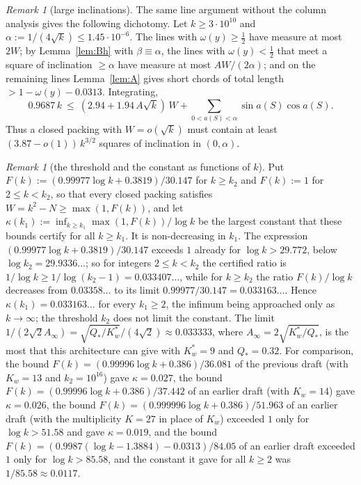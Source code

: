 \documentclass[11pt]{amsart}
\theoremstyle{definition}
\theoremstyle{remark}
\newtheorem{remark}[theorem]{Remark}
\begin{document}
\begin{remark}[large inclinations]
The same line argument without the column analysis gives the following dichotomy. Let $k\ge3\cdot10^{10}$ and
$\alpha:=1/(4\sqrt k)\le1.45\cdot10^{-6}$. The lines with $\omega(y)\ge\frac12$ have measure at most $2W$; by Lemma~\ref{lem:Bh} with $\beta\equiv\alpha$, the lines
with $\omega(y)<\frac12$ that meet a square of inclination $\ge\alpha$ have measure at most $AW/(2\alpha)$; and on the remaining lines
Lemma~\ref{lem:A} gives short chords of total length $>1-\omega(y)-0.0313$. Integrating,
\[
0.9687\,k\ \le\ (2.94+1.94\,A\sqrt k)\,W+\sum_{0<a(S)<\alpha}\sin a(S)\cos a(S).
\]
Thus a closed packing with $W=o(\sqrt k)$ must contain at least $(3.87-o(1))\,k^{3/2}$ squares of inclination in $(0,\alpha)$.
\end{remark}

\begin{remark}[the threshold and the constant as functions of $k$]\label{rem:k}
Put $F(k):=(0.99977\log k+0.3819)/30.147$ for $k\ge k_2$ and $F(k):=1$ for $2\le k<k_2$, so that every closed packing satisfies
$W=k^2-N\ge\max(1,F(k))$, and let $\kappa(k_1):=\inf_{k\ge k_1}\max(1,F(k))/\log k$ be the largest constant that these bounds certify for
all $k\ge k_1$. It is non-decreasing in $k_1$. The expression $(0.99977\log k+0.3819)/30.147$ exceeds $1$ already for $\log k>29.772$,
below $\log k_2=29.9336\ldots$; so for integers $2\le k<k_2$ the certified ratio is $1/\log k\ge1/\log(k_2-1)=0.033407\ldots$, while for
$k\ge k_2$ the ratio $F(k)/\log k$ decreases from $0.03358\ldots$ to its limit $0.99977/30.147=0.033163\ldots$. Hence
$\kappa(k_1)=0.033163\ldots$ for every $k_1\ge2$, the infimum being approached only as $k\to\infty$; the threshold $k_2$ does not limit
the constant. The limit $1/(2\sqrt2A_\infty)=\sqrt{Q_*/K_w^*}/(4\sqrt2)\approx0.033333$, where $A_\infty=2\sqrt{K_w^*/Q_*}$, is the most
that this architecture can give with $K_w^*=9$ and $Q_*=0.32$. For comparison, the bound $F(k)=(0.99996\log k+0.386)/36.081$ of the
previous draft (with $K_w=13$ and $k_2=10^{16}$) gave $\kappa=0.027$, the bound $F(k)=(0.99996\log k+0.386)/37.442$ of an earlier draft
(with $K_w=14$) gave $\kappa=0.026$, the bound
$F(k)=(0.999996\log k+0.386)/51.963$ of an earlier draft (with the multiplicity $K=27$ in place of $K_w$) exceeded $1$ only for
$\log k>51.58$ and gave $\kappa=0.019$, and the bound $F(k)=(0.9987(\log k-1.3884)-0.0313)/84.05$ of an earlier draft exceeded $1$ only
for $\log k>85.58$, and the constant it gave for all $k\ge2$ was $1/85.58\approx0.0117$.
\end{remark}
\end{document}
